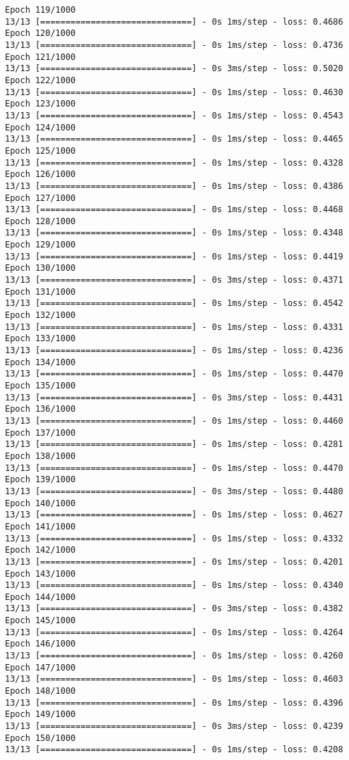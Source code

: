 \documentclass[11pt]{article}
\begin{document}
\begin{Verbatim}[commandchars=\\\{\}]
Epoch 119/1000
13/13 [==============================] - 0s 1ms/step - loss: 0.4686
Epoch 120/1000
13/13 [==============================] - 0s 1ms/step - loss: 0.4736
Epoch 121/1000
13/13 [==============================] - 0s 3ms/step - loss: 0.5020
Epoch 122/1000
13/13 [==============================] - 0s 1ms/step - loss: 0.4630
Epoch 123/1000
13/13 [==============================] - 0s 1ms/step - loss: 0.4543
Epoch 124/1000
13/13 [==============================] - 0s 1ms/step - loss: 0.4465
Epoch 125/1000
13/13 [==============================] - 0s 1ms/step - loss: 0.4328
Epoch 126/1000
13/13 [==============================] - 0s 1ms/step - loss: 0.4386
Epoch 127/1000
13/13 [==============================] - 0s 1ms/step - loss: 0.4468
Epoch 128/1000
13/13 [==============================] - 0s 1ms/step - loss: 0.4348
Epoch 129/1000
13/13 [==============================] - 0s 1ms/step - loss: 0.4419
Epoch 130/1000
13/13 [==============================] - 0s 3ms/step - loss: 0.4371
Epoch 131/1000
13/13 [==============================] - 0s 1ms/step - loss: 0.4542
Epoch 132/1000
13/13 [==============================] - 0s 1ms/step - loss: 0.4331
Epoch 133/1000
13/13 [==============================] - 0s 1ms/step - loss: 0.4236
Epoch 134/1000
13/13 [==============================] - 0s 1ms/step - loss: 0.4470
Epoch 135/1000
13/13 [==============================] - 0s 3ms/step - loss: 0.4431
Epoch 136/1000
13/13 [==============================] - 0s 1ms/step - loss: 0.4460
Epoch 137/1000
13/13 [==============================] - 0s 1ms/step - loss: 0.4281
Epoch 138/1000
13/13 [==============================] - 0s 1ms/step - loss: 0.4470
Epoch 139/1000
13/13 [==============================] - 0s 3ms/step - loss: 0.4480
Epoch 140/1000
13/13 [==============================] - 0s 1ms/step - loss: 0.4627
Epoch 141/1000
13/13 [==============================] - 0s 1ms/step - loss: 0.4332
Epoch 142/1000
13/13 [==============================] - 0s 1ms/step - loss: 0.4201
Epoch 143/1000
13/13 [==============================] - 0s 1ms/step - loss: 0.4340
Epoch 144/1000
13/13 [==============================] - 0s 3ms/step - loss: 0.4382
Epoch 145/1000
13/13 [==============================] - 0s 1ms/step - loss: 0.4264
Epoch 146/1000
13/13 [==============================] - 0s 1ms/step - loss: 0.4260
Epoch 147/1000
13/13 [==============================] - 0s 1ms/step - loss: 0.4603
Epoch 148/1000
13/13 [==============================] - 0s 1ms/step - loss: 0.4396
Epoch 149/1000
13/13 [==============================] - 0s 3ms/step - loss: 0.4239
Epoch 150/1000
13/13 [==============================] - 0s 1ms/step - loss: 0.4208

\end{Verbatim}
\end{document}
